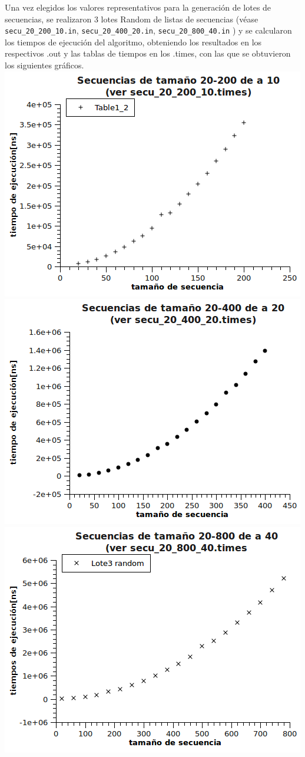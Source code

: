 Una vez elegidos los valores representativos para la generación de lotes de secuencias, se realizaron 3 lotes Random de listas de secuencias (véase \texttt{secu\_20\_200\_10.in}, \texttt{secu\_20\_400\_20.in}, \texttt{secu\_20\_800\_40.in} ) y se calcularon los tiempos de ejecución del algoritmo, obteniendo los resultados en los respectivos .out y las tablas de tiempos en los .times, con las que se obtuvieron los siguientes gráficos.
\newline
\newline
\includegraphics[scale=0.8]{img/ej1/Lote1.png}
\newline
\includegraphics[scale=0.8]{img/ej1/Lote2.png}
\newline
\includegraphics[scale=0.8]{img/ej1/Lote3.png}
\newline
